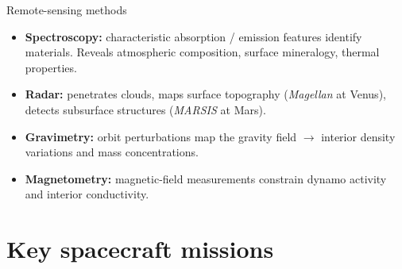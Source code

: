 \documentclass[aspectratio=169, 11pt]{beamer}
\begin{document}
\begin{frame}{Remote-sensing methods}
  \begin{itemize}
    \item \textbf{Spectroscopy:} characteristic absorption / emission features identify materials. Reveals atmospheric composition, surface mineralogy, thermal properties.
    \item \textbf{Radar:} penetrates clouds, maps surface topography (\emph{Magellan} at Venus), detects subsurface structures (\emph{MARSIS} at Mars).
    \item \textbf{Gravimetry:} orbit perturbations map the gravity field $\to$ interior density variations and mass concentrations.
    \item \textbf{Magnetometry:} magnetic-field measurements constrain dynamo activity and interior conductivity.
  \end{itemize}
\end{frame}


\section{Key spacecraft missions}
\end{document}
